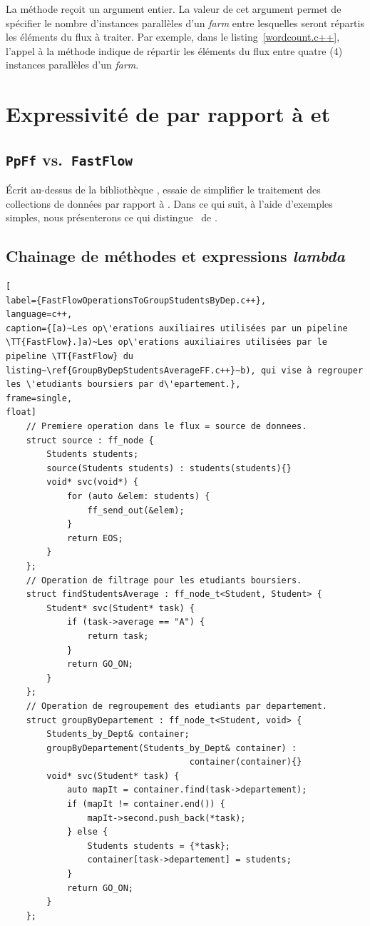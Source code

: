 La méthode  reçoit un argument entier.
%
La valeur de cet argument permet de sp\'ecifier le nombre d'instances parall\`eles d'un \emph{farm} entre lesquelles seront r\'epartis les \'el\'ements du flux \`a traiter. Par exemple, dans le listing~\ref{wordcount.c++}, l'appel \`a la m\'ethode  indique de r\'epartir les \'el\'ements du flux entre quatre (4) instances parall\`eles d'un \emph{farm}.



\section{Expressivit\'e de  par rapport à  et
}


\label{PpFfExpressivities.sect}




\subsection{\texttt{PpFf} vs.\ \texttt{FastFlow}}


\'Ecrit au-dessus de la biblioth\`eque ,  essaie de simplifier le traitement des collections de donn\'ees par rapport à . Dans ce qui suit, à l'aide d'exemples simples, nous pr\'esenterons ce qui distingue \ppff\ de .



\subsection*{Chainage de m\'ethodes et expressions \emph{lambda}}

\begin{lstlisting}[
label={FastFlowOperationsToGroupStudentsByDep.c++},
language=c++,
caption={[a)~Les op\'erations auxiliaires utilisées par un pipeline \TT{FastFlow}.]a)~Les op\'erations auxiliaires utilisées par le pipeline \TT{FastFlow} du listing~\ref{GroupByDepStudentsAverageFF.c++}~b), qui vise à regrouper les \'etudiants boursiers par d\'epartement.},
frame=single,
float]
    // Premiere operation dans le flux = source de donnees.
	struct source : ff_node {
		Students students;
		source(Students students) : students(students){}
		void* svc(void*) {
			for (auto &elem: students) {
				ff_send_out(&elem);
			}	
			return EOS;	
		}
	};
	// Operation de filtrage pour les etudiants boursiers.
	struct findStudentsAverage : ff_node_t<Student, Student> {
		Student* svc(Student* task) {
			if (task->average == "A") {
				return task;
			}
			return GO_ON;
		}
	};
	// Operation de regroupement des etudiants par departement.
	struct groupByDepartement : ff_node_t<Student, void> {
		Students_by_Dept& container;
		groupByDepartement(Students_by_Dept& container) :
									container(container){}
		void* svc(Student* task) {
			auto mapIt = container.find(task->departement);
			if (mapIt != container.end()) {
				mapIt->second.push_back(*task);
			} else {
				Students students = {*task};
				container[task->departement] = students;
			}
			return GO_ON;		
		}
	};      
\end{lstlisting}


